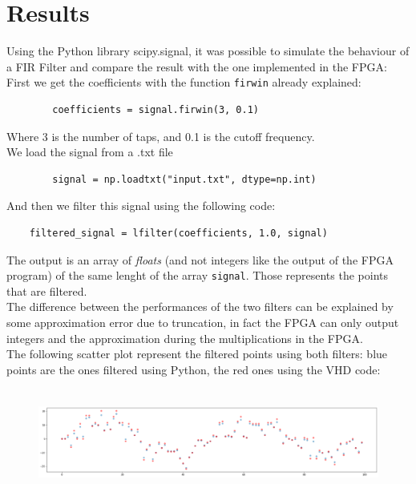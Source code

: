 \documentclass[11pt,a4paper,twocolumn]{IEEEtran}
\begin{document}
	\section{Results}
	Using the Python library scipy.signal, it was possible to simulate the behaviour of a FIR Filter and compare the result with the one implemented in the FPGA:\\
	First we get the coefficients with the function \texttt{firwin} already explained:
	\begin{lstlisting}
		coefficients = signal.firwin(3, 0.1)
	\end{lstlisting}
	Where 3 is the number of taps, and 0.1 is the cutoff frequency.\\
	We load the signal from a .txt file
	\begin{lstlisting}
		signal = np.loadtxt("input.txt", dtype=np.int)
	\end{lstlisting}
	And then we filter this signal using the following code:
	\begin{lstlisting}
	filtered_signal = lfilter(coefficients, 1.0, signal)
	\end{lstlisting}
	The output is an array of \emph{floats} (and not integers like the output of the FPGA program) of the same lenght of the array \texttt{signal}. Those represents the points that are filtered.\\
	The difference between the performances of the two filters can be explained by some approximation error due to truncation, in fact the FPGA can only output integers and the approximation during the multiplications in the FPGA.\\
	The following scatter plot represent the filtered points using both filters: blue points are the ones filtered using Python, the red ones using the VHD code:
	\begin{figure}[h]
		\centering
		\includegraphics[width=1\linewidth,height=3.5cm]{img/index}
	\end{figure}
	
\end{document}
